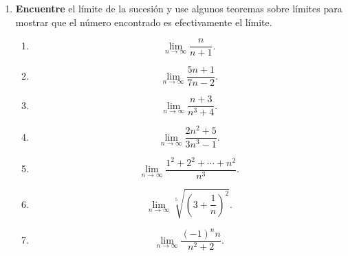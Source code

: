 \documentclass[12pt]{article}
\begin{document}
\begin{enumerate}
\begin{proof}
\begin{equation*}
\begin{split}
                <&\frac{\varepsilon}{2}+\frac{\varepsilon}{2}\\
                =&\varepsilon\\
            \end{split}
        \end{equation*}
        Por tanto, $\left\{y_n\right\}_{n=1}^{\infty}$ es convergente y lo hace a $l_2-l_1$.
        \qed
    \end{proof}
    \item \textbf{Encuentre} el límite de la sucesión y use algunos teoremas sobre límites para mostrar que el número encontrado es efectivamente el límite.
        \begin{multicols}{2}
            \begin{enumerate}
                \item \begin{equation*}
                        \lim_{n\rightarrow\infty}\frac{n}{n+1}.
                    \end{equation*}
                \item \begin{equation*}
                        \lim_{n\rightarrow\infty}\frac{5n+1}{7n-2}.
                    \end{equation*}
                \item \begin{equation*}
                        \lim_{n\rightarrow\infty}\frac{n+3}{n^3+4}.
                    \end{equation*}
                \item \begin{equation*}
                        \lim_{n\rightarrow\infty}\frac{2n^2+5}{3n^3-1}.
                    \end{equation*}
                \item \begin{equation*}
                        \lim_{n\rightarrow\infty}\frac{1^2+2^2+\cdots+n^2}{n^3}.
                    \end{equation*}
                \item \begin{equation*}
                        \lim_{n\rightarrow\infty}\sqrt[5]{\left(3+\frac{1}{n}\right)^2}.
                    \end{equation*}
                \item \begin{equation*}
                        \lim_{n\rightarrow\infty}\frac{\left(-1\right)^nn}{n^2+2}.

\end{equation*}
\end{enumerate}
\end{multicols}
\end{enumerate}
\end{document}
